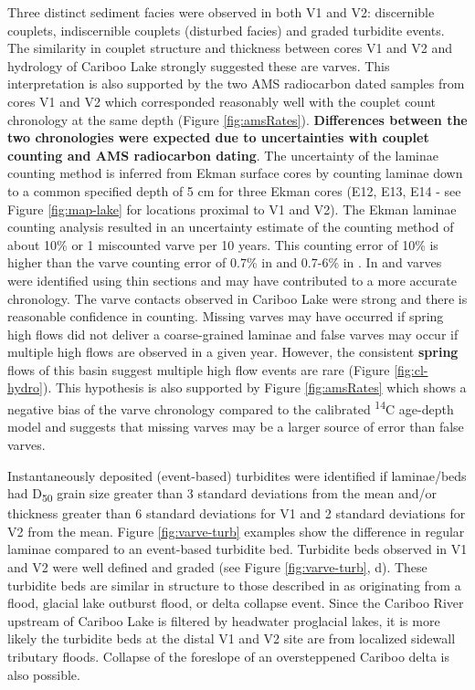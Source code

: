 \documentclass[Royal,times,doublespace,sageh]{sagej}
\begin{document}
Three distinct sediment facies were observed in both V1 and V2:
discernible couplets, indiscernible couplets (disturbed facies) and
graded turbidite events. The similarity in couplet structure and
thickness between cores V1 and V2 and hydrology of Cariboo Lake strongly
suggested these are varves. This interpretation is also supported by the
two AMS radiocarbon dated samples from cores V1 and V2 which
corresponded reasonably well with the couplet count chronology at the
same depth (Figure \ref{fig:amsRates}). \textbf{Differences between the
two chronologies were expected due to uncertainties with couplet
counting and AMS radiocarbon dating}. The uncertainty of the laminae
counting method is inferred from Ekman surface cores by counting laminae
down to a common specified depth of 5 cm for three Ekman cores (E12,
E13, E14 - see Figure \ref{fig:map-lake} for locations proximal to V1
and V2). The Ekman laminae counting analysis resulted in an uncertainty
estimate of the counting method of about 10\% or 1 miscounted varve per
10 years. This counting error of 10\% is higher than the varve counting
error of 0.7\% in \citet{Menounos2008c} and 0.7-6\% in
\citet{Zolitschka1991}. In \citet{Menounos2008c} and
\citet{Zolitschka1991} varves were identified using thin sections and
may have contributed to a more accurate chronology. The varve contacts
observed in Cariboo Lake were strong and there is reasonable confidence
in counting. Missing varves may have occurred if spring high flows did
not deliver a coarse-grained laminae and false varves may occur if
multiple high flows are observed in a given year. However, the
consistent \textbf{spring} flows of this basin suggest multiple high
flow events are rare (Figure \ref{fig:cl-hydro}). This hypothesis is
also supported by Figure \ref{fig:amsRates} which shows a negative bias
of the varve chronology compared to the calibrated \textsuperscript{14}C
age-depth model and suggests that missing varves may be a larger source
of error than false varves.

Instantaneously deposited (event-based) turbidites were identified if
laminae/beds had D\textsubscript{50} grain size greater than 3 standard
deviations from the mean and/or thickness greater than 6 standard
deviations for V1 and 2 standard deviations for V2 from the mean. Figure
\ref{fig:varve-turb} examples show the difference in regular laminae
compared to an event-based turbidite bed. Turbidite beds observed in V1
and V2 were well defined and graded (see Figure \ref{fig:varve-turb},
d). These turbidite beds are similar in structure to those described in
\citet{sabatier2022} as originating from a flood, glacial lake outburst
flood, or delta collapse event. Since the Cariboo River upstream of
Cariboo Lake is filtered by headwater proglacial lakes, it is more
likely the turbidite beds at the distal V1 and V2 site are from
localized sidewall tributary floods. Collapse of the foreslope of an
oversteppened Cariboo delta is also possible.
\end{document}
